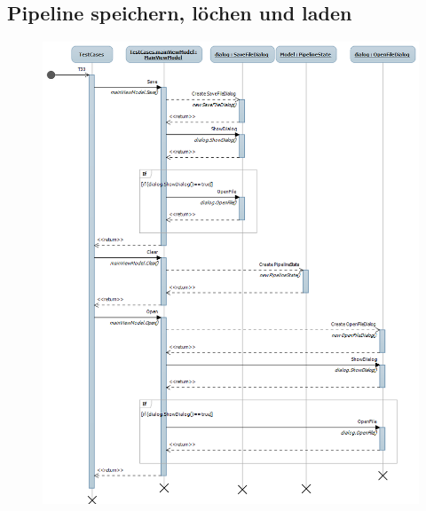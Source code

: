 \subsection{Pipeline speichern, löchen und laden}
\begin{figure}[h!]
\begin{center}
\includegraphics[width=\textwidth]{Diagrams/SaveClearLoad.png}
\end{center}
\end{figure}
\newpage

